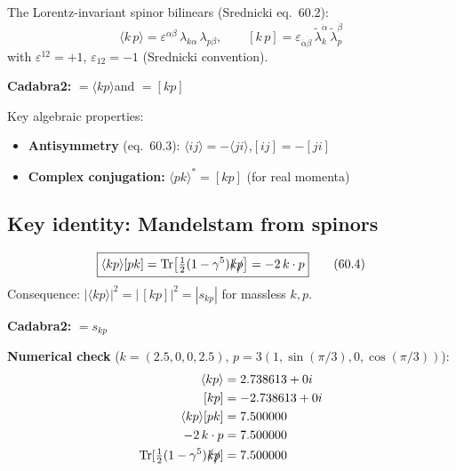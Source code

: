 The Lorentz-invariant spinor bilinears (Srednicki eq.~60.2):
\begin{equation}
  \langle k\,p\rangle = \varepsilon^{\alpha\beta}\,\lambda_{k\alpha}\,\lambda_{p\beta},
  \qquad
  [k\,p] = \varepsilon_{\dot\alpha\dot\beta}\,\tilde\lambda_k^{\dot\alpha}\,\tilde\lambda_p^{\dot\beta}
  \tag{60.2}
\end{equation}
with $\varepsilon^{12}=+1$, $\varepsilon_{12}=-1$ (Srednicki convention).

\textbf{Cadabra2:}\quad
{} $= \langle kp\rangle$\quad and\quad
{} $= [kp]$

\medskip
Key algebraic properties:
\begin{itemize}
  \item \textbf{Antisymmetry} (eq.~60.3): $\langle ij\rangle = -\langle ji\rangle$,\quad $[ij]=-[ji]$
  \item \textbf{Complex conjugation:} $\langle pk\rangle^* = [kp]$ (for real momenta)
\end{itemize}

\subsection{Key identity: Mandelstam from spinors}

\begin{equation}
  \boxed{
    \langle kp\rangle[pk]
    = \mathrm{Tr}\bigl[\tfrac12(1-\gamma^5)\slashed{k}\slashed{p}\bigr]
    = -2\,k\cdot p
  }
  \tag{60.4}
\end{equation}
Consequence: $|\langle kp\rangle|^2 = |\,[kp]|^2 = |s_{kp}|$ for massless $k,p$.

\textbf{Cadabra2:}  $= s_{kp}$

\textbf{Numerical check} ($k=(2.5,0,0,2.5)$, $p=3(1,\sin(\pi/3),0,\cos(\pi/3))$):
\begin{align*}
  \langle kp\rangle &= 2.738613 + 0i \\
  [kp] &= -2.738613 + 0i \\
  \langle kp\rangle[pk] &= 7.500000 \\
  -2\,k\cdot p &= 7.500000 \\
  \mathrm{Tr}[\tfrac12(1-\gamma^5)\slashed{k}\slashed{p}] &= 7.500000
\end{align*}


